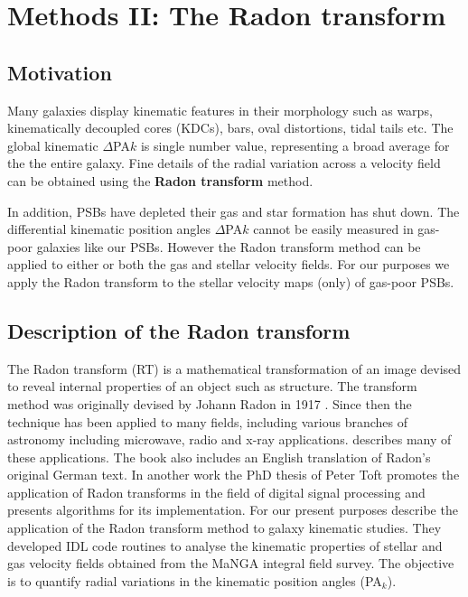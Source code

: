 \section{Methods II: The Radon transform}
\label{sec:methods-II-Radon}

\subsection{Motivation}
\label{sec:motivation}

Many galaxies display kinematic features in their morphology such as warps, kinematically decoupled cores (KDCs), bars, oval distortions, tidal tails etc. The global kinematic $\Delta$PA${k}$ is single number value, representing a broad average for the the entire galaxy. Fine details of the radial variation across a velocity field can be obtained using the \textbf{Radon transform} method.

In addition, PSBs have depleted their gas and star formation has shut down. The differential kinematic position angles $\Delta$PA${k}$ cannot be easily measured in gas-poor galaxies like our PSBs. However the Radon transform method can be applied to either or both the gas and stellar velocity fields. For our purposes we apply the Radon transform to the stellar velocity maps (only) of gas-poor PSBs. 


\subsection{Description of the Radon transform}

The Radon transform (RT) is a mathematical transformation of an image devised to reveal internal properties of an object such as structure. The transform method was originally devised by Johann Radon in 1917 \citep{radon1917determination}. Since then the technique has been applied to many fields, including various branches of astronomy including microwave, radio and x-ray applications. \citet{deans2007radon} describes many of these applications. The book also includes an English translation of Radon's original German text. In another work the PhD thesis of  Peter Toft \citet{7910dc8d5b654c90ac4bc94c67d06f01} promotes the application of Radon transforms in the field of digital signal processing and presents algorithms for its implementation. For our present purposes \cite{2018MNRAS.480.2217S} describe the application of the Radon transform method to galaxy kinematic studies. They developed IDL code routines to analyse the kinematic properties of stellar and gas velocity fields obtained from the MaNGA integral field survey. The objective is to quantify radial variations in the kinematic position angles (PA$_{k}$).

